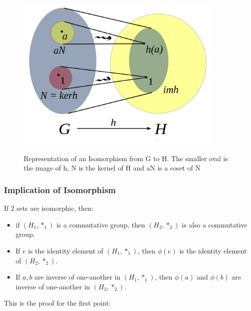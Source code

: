 \documentclass{article}
\begin{document}
\begin{figure}[h]
  \hfill\includegraphics[width=0.9\textwidth]{isomorphism.png}\hspace*{\fill}
  \label{fig:isomorphism}
  
  \caption{Representation of an Isomorphism from G to H. The smaller oval is the image of h, N is the kernel of H and aN is a coset of N}
\end{figure}

\subsubsection{Implication of Isomorphism} If 2 sets are isomorphic, then:
\begin{itemize}
\item if $ (H_1, *_1) $ is a commutative group, then $ (H_2, *_2) $ is also a commutative group.
\item If $ e $ is the identity element of $ (H_1, *_1) $, then $ \phi(e) $ is the identity element of $ (H_2, *_2) $.
\item If $ a,b $ are inverse of one-another in $ (H_1, *_1) $, then $ \phi(a) $ and $ \phi(b) $ are inverse of one-another in $ (H_2, *_2) $. 
\end{itemize}
This is the proof for the first point:
\end{document}
